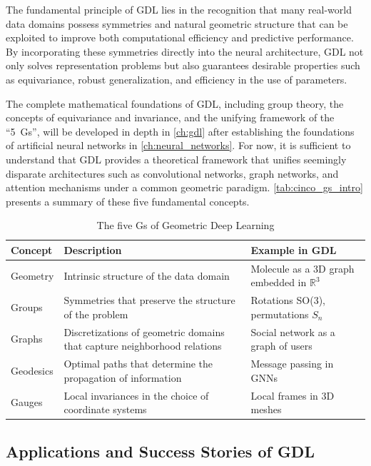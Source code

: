 The fundamental principle of \gls{GDL} lies in the recognition that many real-world data domains possess symmetries and natural geometric structure that can be exploited to improve both computational efficiency and predictive performance. By incorporating these symmetries directly into the neural architecture, \gls{GDL} not only solves representation problems but also guarantees desirable properties such as equivariance, robust generalization, and efficiency in the use of parameters.

The complete mathematical foundations of \gls{GDL}, including group theory, the concepts of equivariance and invariance, and the unifying framework of the ``5~Gs'', will be developed in depth in \autoref{ch:gdl} after establishing the foundations of artificial neural networks in \autoref{ch:neural_networks}. For now, it is sufficient to understand that \gls{GDL} provides a theoretical framework that unifies seemingly disparate architectures such as convolutional networks, graph networks, and attention mechanisms under a common geometric paradigm. \autoref{tab:cinco_gs_intro} presents a summary of these five fundamental concepts.

\begin{table}[h]
\centering
\caption{The five Gs of Geometric Deep Learning}
\label{tab:cinco_gs_intro}
\begin{tabular}{@{}lp{6cm}p{4.5cm}@{}}
\toprule
\textbf{Concept} & \textbf{Description} & \textbf{Example in GDL} \\
\midrule
Geometry & Intrinsic structure of the data domain & Molecule as a 3D graph embedded in $\mathbb{R}^3$ \\
\addlinespace
Groups & Symmetries that preserve the structure of the problem & Rotations SO(3), permutations $S_n$ \\
\addlinespace
Graphs & Discretizations of geometric domains that capture neighborhood relations & Social network as a graph of users \\
\addlinespace
Geodesics & Optimal paths that determine the propagation of information & Message passing in GNNs \\
\addlinespace
Gauges & Local invariances in the choice of coordinate systems & Local frames in 3D meshes \\
\bottomrule
\end{tabular}
\end{table}


\subsection{Applications and Success Stories of GDL}\label{subsec:casos_exito_gdl}

